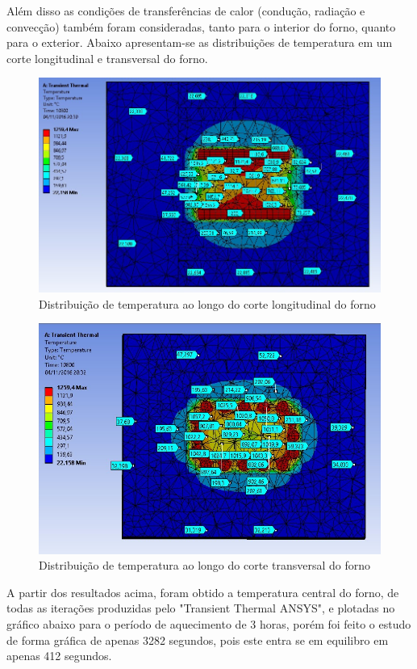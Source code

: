 Além disso as condições de transferências de calor (condução, radiação e convecção)
também foram consideradas, tanto para o interior do forno, quanto para o exterior. Abaixo
apresentam-se as distribuições de temperatura em um corte longitudinal e transversal do forno.
\begin{figure}[H]
	\centering
	\label{ansys16}
	\includegraphics[keepaspectratio=true,scale=0.7]{figuras/ansys15.jpg}
    \caption{Distribuição de temperatura ao longo do corte longitudinal do forno}
\end{figure}
\begin{figure}[H]
	\centering
	\label{ansys16}
	\includegraphics[keepaspectratio=true,scale=0.7]{figuras/ansys16.jpg}
    \caption{Distribuição de temperatura ao longo do corte transversal do forno}
\end{figure}

A partir dos resultados acima, foram obtido a temperatura central do forno, de todas as
iterações produzidas pelo "Transient Thermal ANSYS", e plotadas no gráfico abaixo para o período
de aquecimento de 3 horas, porém foi feito o estudo de forma gráfica de apenas 3282 segundos,
pois este entra se em equilibro em apenas 412 segundos.


